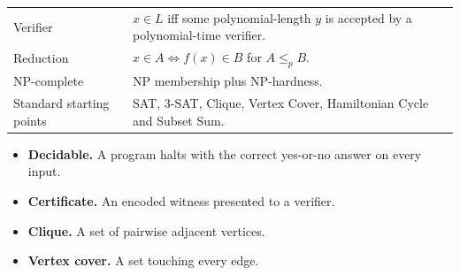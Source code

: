 \documentclass[12pt,a4paper]{article}
\renewcommand{\arraystretch}{1.45}
\begin{document}
\begin{tcolorbox}[formulabox, title={Key Concepts at a Glance}]
\renewcommand{\arraystretch}{1.35}
\noindent\begin{tabularx}{\linewidth}{B{4.5cm}Y}
Verifier & $x\in L$ iff some polynomial-length $y$ is accepted by a polynomial-time verifier. \\[3pt]
Reduction & $x\in A\iff f(x)\in B$ for $A\le_p B$. \\[3pt]
NP-complete & $\mathrm{NP}$ membership plus NP-hardness. \\[3pt]
Standard starting points & SAT, 3-SAT, Clique, Vertex Cover, Hamiltonian Cycle and Subset Sum. \\[3pt]
\end{tabularx}\par
\end{tcolorbox}

\begin{tcolorbox}[defbox, title={One-Line Definitions}]
\begin{itemize}[leftmargin=*, itemsep=3pt, topsep=4pt]
  \item \textbf{Decidable.} A program halts with the correct yes-or-no answer on every input.
  \item \textbf{Certificate.} An encoded witness presented to a verifier.
  \item \textbf{Clique.} A set of pairwise adjacent vertices.
  \item \textbf{Vertex cover.} A set touching every edge.
\end{itemize}
\end{tcolorbox}
\end{document}
